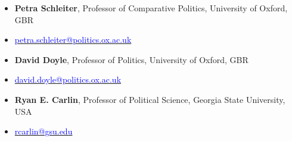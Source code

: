 





\begin{publications}

\begin{itemize}
\item[]{\small {\bfseries Petra Schleiter}, Professor of Comparative Politics, University of Oxford, GBR}
\item[]{\vspace{-1mm}\textcolor{oxfordblue}{\faEnvelope} \hspace{0.1mm} {\small \href{mailto:petra.schleiter@politics.ox.ac.uk}{\textcolor{blue}{petra.schleiter@politics.ox.ac.uk}}}} \vspace{1.5mm}
\item[]{\small {\bfseries David Doyle}, Professor of Politics, University of Oxford, GBR}
\item[]{\vspace{-1mm}\textcolor{oxfordblue}{\faEnvelope} \hspace{0.1mm} {\small \href{mailto:david.doyle@politics.ox.ac.uk}{\textcolor{blue}{david.doyle@politics.ox.ac.uk}}}} \vspace{1.5mm}
\item[]{\small {\bfseries Ryan E. Carlin}, Professor of Political Science, Georgia State University, USA}
\item[]{\vspace{-1mm}\textcolor{oxfordblue}{\faEnvelope} \hspace{0.1mm} {\small \href{mailto:rcarlin@gsu.edu}{\textcolor{blue}{rcarlin@gsu.edu}}}} \vspace{1.5mm}
\end{itemize}

\end{publications}
